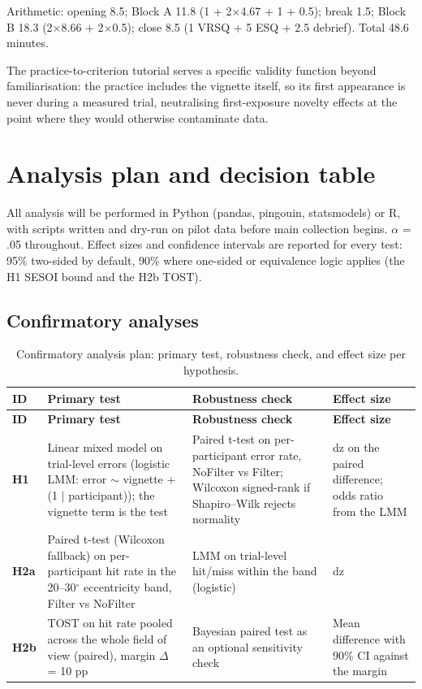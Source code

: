 Arithmetic: opening 8.5; Block A 11.8 (1 + 2$\times$4.67 + 1 + 0.5); break 1.5; Block B 18.3
(2$\times$8.66 + 2$\times$0.5); close 8.5 (1 VRSQ + 5 ESQ + 2.5 debrief). Total 48.6 minutes.

The practice-to-criterion tutorial serves a specific validity function beyond familiarisation: the
practice includes the vignette itself, so its first appearance is never during a measured trial,
neutralising first-exposure novelty effects at the point where they would otherwise contaminate data.


\section{Analysis plan and decision table}

All analysis will be performed in Python (pandas, pingouin, statsmodels) or R, with scripts written
and dry-run on pilot data before main collection begins. $\alpha$ = .05 throughout. Effect sizes and
confidence intervals are reported for every test: 95\% two-sided by default, 90\% where one-sided or
equivalence logic applies (the H1 SESOI bound and the H2b TOST).

\subsection{Confirmatory analyses}

\begin{longtable}{p{}|p{}|p{}|p{}}
\caption{Confirmatory analysis plan: primary test, robustness check, and effect size per hypothesis.}\\
\hline
\textbf{ID} & \textbf{Primary test} & \textbf{Robustness check} & \textbf{Effect size} \\
\hline
\endfirsthead
\hline
\textbf{ID} & \textbf{Primary test} & \textbf{Robustness check} & \textbf{Effect size} \\
\hline
\endhead
\hline
\textbf{H1} & Linear mixed model on trial-level errors (logistic LMM: error $\sim$ vignette + (1 $\mid$ participant)); the vignette term is the test & Paired t-test on per-participant error rate, NoFilter vs Filter; Wilcoxon signed-rank if Shapiro–Wilk rejects normality & dz on the paired difference; odds ratio from the LMM \\
\textbf{H2a} & Paired t-test (Wilcoxon fallback) on per-participant hit rate in the 20–30$^{\circ}$ eccentricity band, Filter vs NoFilter & LMM on trial-level hit/miss within the band (logistic) & dz \\
\textbf{H2b} & TOST on hit rate pooled across the whole field of view (paired), margin $\Delta$ = 10 pp \citep{lakens2017} & Bayesian paired test as an optional sensitivity check & Mean difference with 90\% CI against the margin \\
\hline
\end{longtable}

